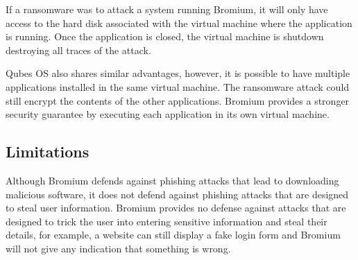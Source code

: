 
If a ransomware was to attack a system running Bromium, it will only have access to the hard disk associated with the virtual machine where the application is running. Once the application is closed, the virtual machine is shutdown destroying all traces of the attack. 

Qubes OS also shares similar advantages, however, it is possible to have multiple applications installed in the same virtual machine. The ransomware attack could still
encrypt the contents of the other applications. Bromium provides a stronger security guarantee by executing each application in its own virtual machine.

\subsection{Limitations}

Although Bromium defends against phishing attacks that lead to downloading malicious software, it does not defend against phishing attacks that are designed to steal user information. Bromium provides no defense against attacks that are designed to trick the user into entering sensitive information and steal their details, for example, a website can still display a fake login form and Bromium will not give any indication that something is wrong.

